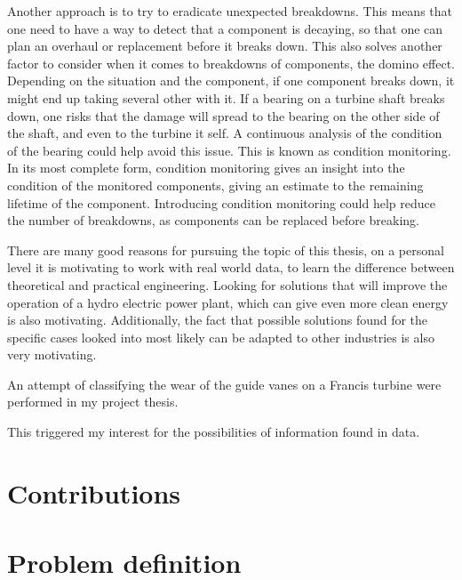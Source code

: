 Another approach is to try to eradicate unexpected breakdowns. This means that one need to have a way to detect that a component is decaying, so that one can plan an overhaul or replacement before it breaks down. This also solves another factor to consider when it comes to breakdowns  of components, the domino effect. Depending on the situation and the component, if one component breaks down, it might end up taking several other with it. If a bearing on a turbine shaft breaks down, one risks that the damage will spread to the bearing on the other side of the shaft, and even to the turbine it self. A continuous analysis of the condition of the bearing could help avoid this issue. This is known as condition monitoring. In its most complete form, condition monitoring gives an insight into the condition of the monitored components, giving an estimate to the remaining lifetime of the component. Introducing condition monitoring could help reduce the number of breakdowns, as components can be replaced before breaking. 

There are many good reasons for pursuing the topic of this thesis, on a personal level it is motivating to work with real world data, to learn the difference between theoretical and practical engineering. Looking for solutions that will improve the operation of a hydro electric power plant, which can give even more clean energy is also motivating. Additionally, the fact that possible solutions found for the specific cases looked into most likely can be adapted to other industries is also very motivating. 

An attempt of classifying the wear of the guide vanes on a Francis turbine were performed in my project thesis.  


This triggered my interest for the possibilities of information found in data. 

\section{Contributions}
    


\section{Problem definition}

